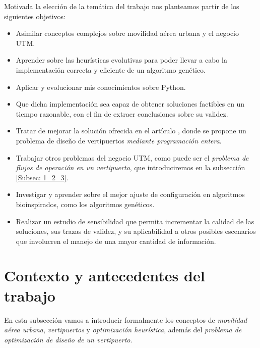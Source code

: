 \documentclass[12pt,a4paper]{book}
\begin{document}
Motivada la elección de la temática del trabajo nos planteamos partir de los siguientes objetivos: 
\begin{itemize}
	\item Asimilar conceptos complejos sobre movilidad aérea urbana y el negocio UTM. 
	\item Aprender sobre las heurísticas evolutivas para poder llevar a cabo la implementación correcta y eficiente de un algoritmo genético. 
	\item Aplicar y evolucionar mis conocimientos sobre Python. 
	\item Que dicha implementación sea capaz de obtener soluciones factibles en un tiempo razonable, con el fin de extraer conclusiones sobre su validez.
	\item Tratar de mejorar la solución ofrecida en el artículo \cite{yu_introduction_2010}, donde se propone un problema de diseño de vertipuertos \textsl{mediante programación entera}. 
	\item Trabajar otros problemas del negocio UTM, como puede ser el \textsl{problema de flujos de operación en un vertipuerto}, que introduciremos en la subsección \ref{Subsec: 1_2_3}. 
	\item Investigar y aprender sobre el mejor ajuste de configuración en algoritmos bioinspirados, como los algoritmos genéticos. 
	\item Realizar un estudio de sensibilidad que permita incrementar la calidad de las soluciones, sus trazas de validez, y su aplicabilidad a otros posibles escenarios que involucren el manejo de una mayor cantidad de información.  
\end{itemize}  
    
\section{Contexto y antecedentes del trabajo} \label{Sec:1_2}
En esta subsección vamos a introducir formalmente los conceptos de \textsl{movilidad aérea urbana}, \textsl{vertipuertos} y \textsl{optimización heurística}, además del \textsl{problema de optimización de diseño de un vertipuerto}.

 
\end{document}
